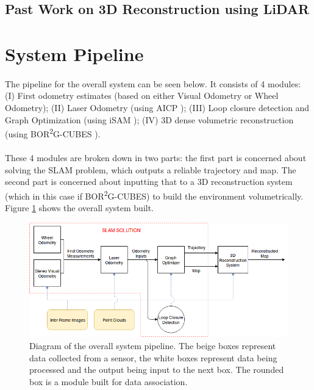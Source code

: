 \documentclass[11pt]{article}
\begin{document}
	\subsection{Past Work on 3D Reconstruction using LiDAR}
	

	\newpage
	\section{System Pipeline} \label{pipeline}
	\paragraph{}
	The pipeline for the overall system can be seen below. It consists of 4 modules: (I) First odometry estimates (based on either Visual Odometry or Wheel Odometry); (II) Laser Odometry (using AICP \cite{7989547}); (III) Loop closure detection and Graph Optimization (using iSAM \cite{Kaess08tro}); (IV) 3D dense volumetric reconstruction (using BOR\textsuperscript{2}G-CUBES \cite{TannerFSR2015}\cite{TannerArXiv2016}).

	\paragraph{}
	These 4 modules are broken down in two parts: the first part is concerned about solving the SLAM problem, which outputs a reliable trajectory and map. The second part is concerned about inputting that to a 3D reconstruction system (which in this case if BOR\textsuperscript{2}G-CUBES) to build the environment volumetrically. Figure \ref{fig:SystemPipelineFigure1} shows the overall system built.
	\begin{figure}[h]
		\includegraphics[width=\linewidth]{SystemPipeline}
		\caption{Diagram of the overall system pipeline. The beige boxes represent data collected from a sensor, the white boxes represent data being processed and the output being input to the next box. The rounded box is a module built for data association.}
		\label{fig:SystemPipelineFigure1}
	\end{figure}
	
\end{document}
